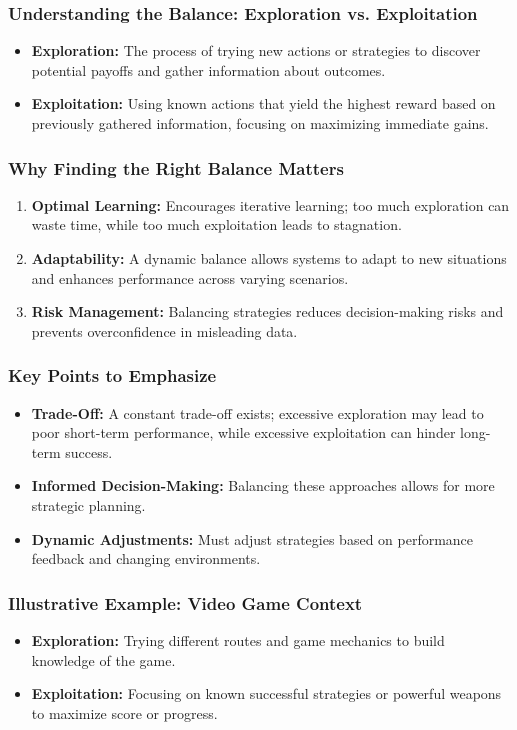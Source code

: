 \documentclass[aspectratio=169]{beamer}
\begin{document}
\begin{frame}[fragile]
    \frametitle{Understanding the Balance: Exploration vs. Exploitation}
    \begin{itemize}
        \item \textbf{Exploration:} The process of trying new actions or strategies to discover potential payoffs and gather information about outcomes.
        \item \textbf{Exploitation:} Using known actions that yield the highest reward based on previously gathered information, focusing on maximizing immediate gains.
    \end{itemize}
\end{frame}

\begin{frame}[fragile]
    \frametitle{Why Finding the Right Balance Matters}
    \begin{enumerate}
        \item \textbf{Optimal Learning:} Encourages iterative learning; too much exploration can waste time, while too much exploitation leads to stagnation.
        \item \textbf{Adaptability:} A dynamic balance allows systems to adapt to new situations and enhances performance across varying scenarios.
        \item \textbf{Risk Management:} Balancing strategies reduces decision-making risks and prevents overconfidence in misleading data.
    \end{enumerate}
\end{frame}

\begin{frame}[fragile]
    \frametitle{Key Points to Emphasize}
    \begin{itemize}
        \item \textbf{Trade-Off:} A constant trade-off exists; excessive exploration may lead to poor short-term performance, while excessive exploitation can hinder long-term success.
        \item \textbf{Informed Decision-Making:} Balancing these approaches allows for more strategic planning.
        \item \textbf{Dynamic Adjustments:} Must adjust strategies based on performance feedback and changing environments.
    \end{itemize}
\end{frame}

\begin{frame}[fragile]
    \frametitle{Illustrative Example: Video Game Context}
    \begin{itemize}
        \item \textbf{Exploration:} Trying different routes and game mechanics to build knowledge of the game. 
        \item \textbf{Exploitation:} Focusing on known successful strategies or powerful weapons to maximize score or progress.
    \end{itemize}
\end{frame}
\end{document}
